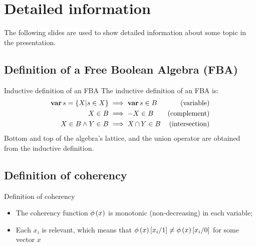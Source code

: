 \documentclass{beamer}
\def\FBA{%
	Free Boolean Algebra (FBA)%
	\gdef\FBA{FBA\xspace}%
	\gdef\FBAs{FBAs\xspace}%
	\gdef\iFBA{an FBA\xspace}%
	\xspace%
}
\def\FBAs{%
	Free Boolean Algebras (FBAs)%
	\gdef\FBA{FBA\xspace}%
	\gdef\FBAs{FBAs\xspace}%
	\gdef\iFBA{an FBA\xspace}%
	\xspace%
}
\def\iFBA{%
	a Free Boolean Algebra (FBA)%
	\gdef\FBA{FBA\xspace}%
	\gdef\FBAs{FBAs\xspace}%
	\gdef\iFBA{an FBA\xspace}%
	\xspace%
}
\def\varop{\ensuremath\operatorname{\mathbf{var}}}
\newcommand{\var}[1]{\ensuremath\varop #1}
\def\inter{\ensuremath\operatorname{\cap}}
\def\ftcoherencyop{\ensuremath\operatorname{\phi}}
\newcommand{\ftcoherency}[1]{\ensuremath\ftcoherencyop\left(#1\right)}
\newcommand{\replace}[2]{\ensuremath\left[#1\middle/#2\right]}
\begin{document}
\begin{frame}[label=end]
\titlepage
\end{frame}

\appendix
\section{Detailed information}

\begin{frame}
	The following slides are used to show detailed information about some topic in the presentation.
\end{frame}

\subsection{Definition of \iFBA}

\begin{frame}[fragile,label=fbadef]{Inductive definition of an FBA}
	The inductive definition of \iFBA is:
	\begin{subequations}
		\begin{align}
		\var s = \{X | s \in X\} & \implies \var s \in B & \text{(variable)}\\
		X \in B & \implies -X \in B                           & \text{(complement)}\\
		X \in B \land Y \in B & \implies X \inter Y \in B     & \text{(intersection)}
		\end{align}
	\end{subequations}
	Bottom and top of the algebra's lattice, and the union operator are obtained from the inductive definition.

	\hyperlink{fba}{}
\end{frame}

\subsection{Definition of coherency}

\begin{frame}[fragile,label=coherencydef]{Definition of coherency}
	\begin{itemize}
		\item The coherency function $\ftcoherency{x}$ is monotonic (non-decreasing) in each variable;
		\item Each $x_i$ is relevant, which means that $\ftcoherency{x}\replace{x_i}{1} \neq \ftcoherency{x}\replace{x_i}{0}$ for some vector $x$
	\end{itemize}
	\hyperlink{not}{}
\end{frame}
\end{document}
